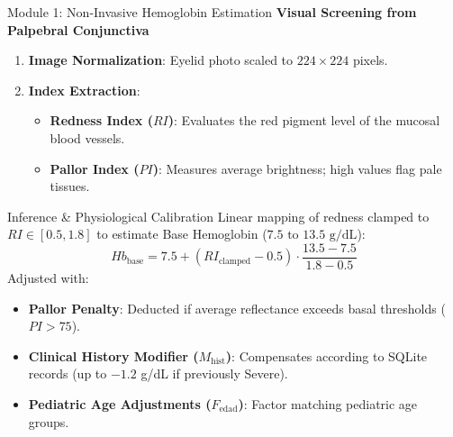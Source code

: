 \documentclass[aspectratio=169]{beamer}
\begin{document}
\begin{frame}{Module 1: Non-Invasive Hemoglobin Estimation}
    \textbf{Visual Screening from Palpebral Conjunctiva}
    \begin{enumerate}
        \item \textbf{Image Normalization}: Eyelid photo scaled to $224 \times 224$ pixels.
        \item \textbf{Index Extraction}:
            \begin{itemize}
                \item \textbf{Redness Index ($RI$)}: Evaluates the red pigment level of the mucosal blood vessels.
                \item \textbf{Pallor Index ($PI$)}: Measures average brightness; high values flag pale tissues.
            \end{itemize}
    \end{enumerate}
    
    \begin{block}{Inference \& Physiological Calibration}
        Linear mapping of redness clamped to $RI \in [0.5, 1.8]$ to estimate Base Hemoglobin ($7.5 \text{ to } 13.5 \text{ g/dL}$):
        \begin{equation*}
            Hb_{\text{base}} = 7.5 + (RI_{\text{clamped}} - 0.5) \cdot \frac{13.5 - 7.5}{1.8 - 0.5}
        \end{equation*}
        Adjusted with:
        \begin{itemize}
            \item \textbf{Pallor Penalty}: Deducted if average reflectance exceeds basal thresholds ($PI > 75$).
            \item \textbf{Clinical History Modifier ($M_{\text{hist}}$)}: Compensates according to SQLite records (up to $-1.2$ g/dL if previously Severe).
            \item \textbf{Pediatric Age Adjustments ($F_{\text{edad}}$)}: Factor matching pediatric age groups.
        \end{itemize}
    \end{block}
\end{frame}
\end{document}
